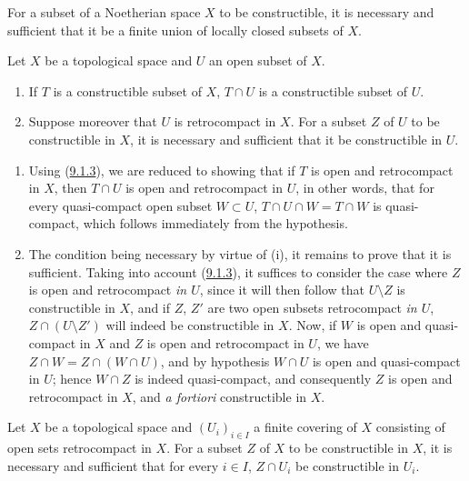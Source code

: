 \begin{corollary}[9.1.7]
\label{0.9.1.7}
For a subset of a Noetherian space $X$ to be constructible, it is necessary
and sufficient that it be a finite union of locally closed subsets of $X$.
\end{corollary}

\begin{proposition}[9.1.8]
\label{0.9.1.8}
Let $X$ be a topological space and $U$ an open subset of $X$.
\begin{enumerate}
  \item[(i)] If $T$ is a constructible subset of $X$, $T\cap U$ is a
    constructible subset of $U$.
  \item[(ii)] Suppose moreover that $U$ is retrocompact in $X$. For a
    subset $Z$ of $U$ to be constructible in $X$, it is necessary and
    sufficient that it be constructible in $U$.
\end{enumerate}
\end{proposition}

\begin{enumerate}
  \item[(i)] Using (\hyperref[0.9.1.3]{9.1.3}), we are reduced to
    showing that if $T$ is open and retrocompact in $X$, then $T\cap U$ is open
    and retrocompact in $U$, in other words, that for every quasi-compact open
    subset $W\subset U$, $T\cap U\cap W=T\cap W$ is quasi-compact, which
    follows immediately from the hypothesis.
  \item[(ii)] The condition being necessary by virtue of (i), it remains
    to prove that it is sufficient. Taking into account
    (\hyperref[0.9.1.3]{9.1.3}), it suffices to consider the case where $Z$
    is open and retrocompact \emph{in $U$}, since it will then follow that
    $U\setminus Z$ is constructible in $X$, and if $Z$, $Z'$ are two
    open subsets retrocompact \emph{in $U$},
    $Z\cap(U\setminus Z')$ will indeed be constructible in $X$. Now, if $W$ is
    open and quasi-compact in $X$ and $Z$ is open and retrocompact in $U$, we
    have $Z\cap W=Z\cap(W\cap U)$, and by hypothesis $W\cap U$ is open and
    quasi-compact in $U$; hence $W\cap Z$ is indeed quasi-compact, and
    consequently $Z$ is open and retrocompact in $X$, and \emph{a fortiori}
    constructible in $X$.
\end{enumerate}

\begin{corollary}[9.1.9]
\label{0.9.1.9}
Let $X$ be a topological space and $(U_i)_{i\in I}$ a finite covering of
$X$ consisting of open sets retrocompact in $X$. For a subset $Z$
of $X$ to be constructible in $X$, it is necessary and sufficient that for
every $i\in I$, $Z\cap U_i$ be constructible in $U_i$.
\end{corollary}

